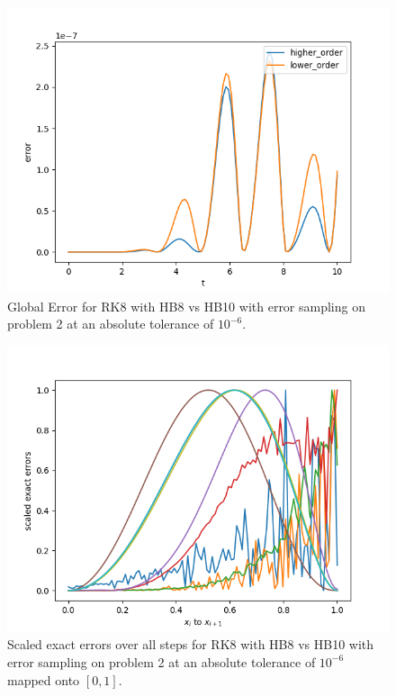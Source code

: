 \begin{figure}[H]
\centering
\includegraphics[width=0.7\linewidth]{./figures/rk8_with_hb8_hb10_sampling_p2_global_error}
\caption{Global Error for RK8 with HB8 vs HB10 with error sampling on problem 2 at an absolute tolerance of $10^{-6}$.}
\label{fig:rk8_with_hb8_hb10_sampling_p2_global_error}
\end{figure}

\begin{figure}[H]
\centering
\includegraphics[width=0.7\linewidth]{./figures/rk8_with_hb8_hb10_sampling_p2_scaled_errors}
\caption{Scaled exact errors over all steps for RK8 with HB8 vs HB10 with error sampling on problem 2 at an absolute tolerance of $10^{-6}$ mapped onto $[0, 1]$.}
\label{fig:rk8_with_hb8_hb10_sampling_p2_scaled_errors}
\end{figure}

